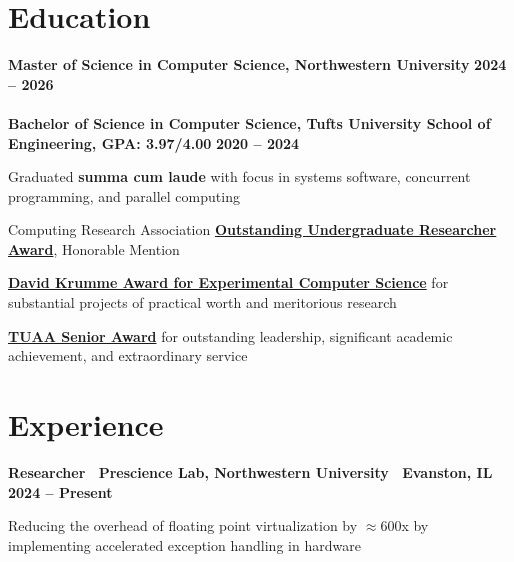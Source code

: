 \documentclass[10pt]{article}
\newenvironment{mylist}[1][]
{\itemize[nosep, wide=0pt, leftmargin=*, after=\strut]}
{\enditemize}
\begin{document}
\section{Education}
\begin{minipage}[t]{\linewidth}
    \textbf{Master of Science in Computer Science, Northwestern University } \hfill \textbf{2024 -- 2026} \\
    \vspace{-0.25cm} \\
    \textbf{Bachelor of Science in Computer Science, Tufts University School of Engineering, GPA: 3.97/4.00} \hfill \textbf{2020 -- 2024}
    \small \begin{mylist}
        \item Graduated \textbf{summa cum laude} with focus in systems software, concurrent programming, and parallel computing
        \item Computing Research Association \href{https://engineering.tufts.edu/cs/research/undergraduate-research/undergrad-research-award-nominees}{\textbf{Outstanding Undergraduate Researcher Award}}, Honorable Mention
        \item \href{https://engineering.tufts.edu/cs/news-events/awards}{\textbf{David Krumme Award for Experimental Computer Science}} for substantial projects of practical worth and meritorious research
        \item \href{https://alumniandfriends.tufts.edu/2024-senior-awardee-liam-strand-e24}{\textbf{TUAA Senior Award}} for outstanding leadership, significant academic achievement, and extraordinary service
    \end{mylist}

\end{minipage}


\section{Experience}
\begin{minipage}[t]{\linewidth}
    \textbf{Researcher \textbar \ Prescience Lab, Northwestern University \textbar \ Evanston, IL} \hfill \textbf{2024 -- Present} 
    \begin{mylist}
        \item Reducing the overhead of floating point virtualization by $\approx$600x by implementing accelerated exception handling in hardware
    \end{mylist}
\end{minipage}
\end{document}
